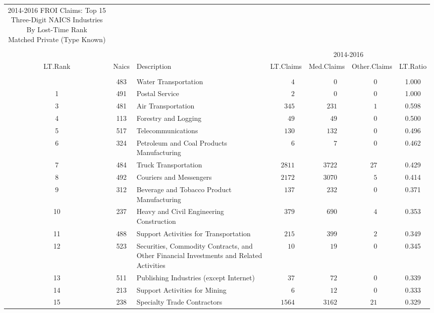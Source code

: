 \documentclass[9pt, oneside]{article}   	%
\begin{document}
\begin{longtable}{ccp{3 in}cccc}
\caption{2014-2016 FROI Claims: Top 15 Three-Digit NAICS Industries By Lost-Time Rank\\ Matched Private (Type Known)}\\ 
\label{Table: LT Rank3}\\
\hline
\toprule
 &  & & \multicolumn{4}{c}{2014-2016} \\ 
LT.Rank  & Naics & Description & LT.Claims & Med.Claims & Other.Claims & \multicolumn{1}{c}{LT.Ratio} \\ 
\midrule\\ [-1\normalbaselineskip]\hline\endhead\hline\endfoot
1  & 483 & Water Transportation & $\phantom{0000}4$ & $\phantom{00000}0$ & $\phantom{00}0$ & 1.000 \\
1  & 491 & Postal Service & $\phantom{0000}2$ & $\phantom{00000}0$ & $\phantom{00}0$ & 1.000 \\
3  & 481 & Air Transportation & $\phantom{00}345$ & $\phantom{000}231$ & $\phantom{00}1$ & 0.598 \\
4  & 113 & Forestry and Logging & $\phantom{000}49$ & $\phantom{0000}49$ & $\phantom{00}0$ & 0.500 \\
5  & 517 & Telecommunications & $\phantom{00}130$ & $\phantom{000}132$ & $\phantom{00}0$ & 0.496 \\
6  & 324 & Petroleum and Coal Products Manufacturing & $\phantom{0000}6$ & $\phantom{00000}7$ & $\phantom{00}0$ & 0.462 \\
7  & 484 & Truck Transportation & $\phantom{0}2811$ & $\phantom{00}3722$ & $\phantom{0}27$ & 0.429 \\
8  & 492 & Couriers and Messengers & $\phantom{0}2172$ & $\phantom{00}3070$ & $\phantom{00}5$ & 0.414 \\
9  & 312 & Beverage and Tobacco Product Manufacturing & $\phantom{00}137$ & $\phantom{000}232$ & $\phantom{00}0$ & 0.371 \\
10  & 237 & Heavy and Civil Engineering Construction & $\phantom{00}379$ & $\phantom{000}690$ & $\phantom{00}4$ & 0.353 \\
11  & 488 & Support Activities for Transportation & $\phantom{00}215$ & $\phantom{000}399$ & $\phantom{00}2$ & 0.349 \\
12  & 523 & Securities, Commodity Contracts, and Other Financial Investments and Related Activities & $\phantom{000}10$ & $\phantom{0000}19$ & $\phantom{00}0$ & 0.345 \\
13  & 511 & Publishing Industries (except Internet) & $\phantom{000}37$ & $\phantom{0000}72$ & $\phantom{00}0$ & 0.339 \\
14  & 213 & Support Activities for Mining & $\phantom{0000}6$ & $\phantom{0000}12$ & $\phantom{00}0$ & 0.333 \\
15  & 238 & Specialty Trade Contractors & $\phantom{0}1564$ & $\phantom{00}3162$ & $\phantom{0}21$ & 0.329 \\


\hline 
\cline{1-1} \cline{2-2} \cline{3-3} \cline{4-4} \cline{5-5}  \cline{6-6} \cline{7-7}%
\hline 
\end{longtable}
\end{document}
